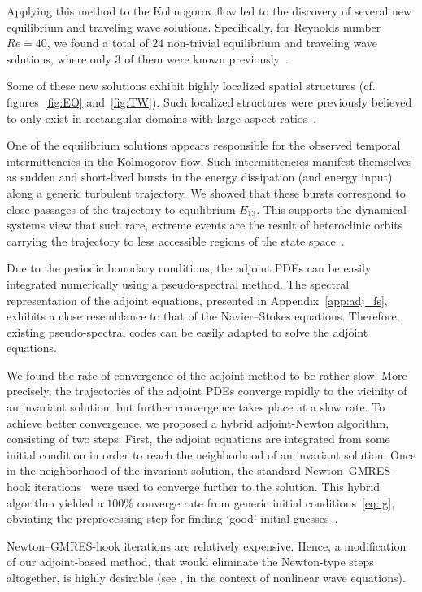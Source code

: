 \documentclass{jfm}
\begin{document}
Applying this method to the Kolmogorov flow led to the discovery of several new
equilibrium and traveling wave solutions. Specifically, for Reynolds number $Re=40$,
we found a total of $24$ non-trivial equilibrium and traveling wave solutions,
where only $3$ of them were known previously~\citep{CK13}.

Some of these new solutions exhibit highly localized spatial structures
(cf. figures~\ref{fig:EQ} and~\ref{fig:TW}). Such localized structures were
previously believed to only exist in rectangular domains with
large aspect ratios~\citep{SGB10,LK14}.

One of the equilibrium solutions appears responsible for the
observed temporal intermittencies in the Kolmogorov flow. Such intermittencies manifest
themselves as sudden and short-lived bursts in the energy dissipation (and energy input)
along a generic turbulent trajectory. We showed that these bursts correspond to
close passages of the trajectory to equilibrium $E_{13}$. This supports the
dynamical systems view that such rare, extreme events are the result of heteroclinic
orbits carrying the trajectory to less accessible regions of the state space~\citep{holmes93}.

Due to the periodic boundary conditions, the adjoint PDEs can be easily integrated numerically using
a pseudo-spectral method. The spectral representation of the adjoint equations, presented
in Appendix~\ref{app:adj_fs}, exhibits a close resemblance to that of the Navier--Stokes equations.
Therefore, existing pseudo-spectral codes can be easily adapted to solve the adjoint equations.

We found the rate of convergence of the adjoint method to be rather slow. More precisely, the
trajectories of the adjoint PDEs converge rapidly to the vicinity of an invariant solution, but
further convergence takes place at a slow rate. To achieve better convergence, we proposed a
hybrid adjoint-Newton algorithm, consisting of two steps: First, the adjoint equations are
integrated from some initial condition in order to reach the neighborhood of an invariant solution.
Once in the neighborhood of the invariant solution, the standard Newton--GMRES-hook
iterations~\citep{DV04} were used to converge further to the solution. This hybrid algorithm
yielded a $100\%$ converge rate from generic initial conditions~\eqref{eq:ig},
obviating the preprocessing step for finding `good' initial guesses~\citep{DV04,CK13}.

Newton--GMRES-hook iterations are relatively expensive. Hence, a modification of
our adjoint-based method, that would eliminate the Newton-type steps altogether, is highly
desirable (see , in the context of nonlinear wave equations).
\end{document}
